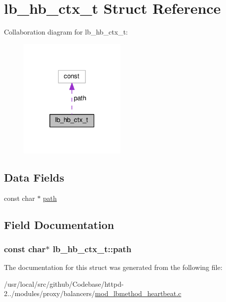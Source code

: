 \hypertarget{structlb__hb__ctx__t}{}\section{lb\+\_\+hb\+\_\+ctx\+\_\+t Struct Reference}
\label{structlb__hb__ctx__t}


Collaboration diagram for lb\+\_\+hb\+\_\+ctx\+\_\+t\+:
\nopagebreak
\begin{figure}[H]
\begin{center}
\leavevmode
\includegraphics[width=147pt]{structlb__hb__ctx__t__coll__graph}
\end{center}
\end{figure}
\subsection*{Data Fields}
\begin{DoxyCompactItemize}
\item 
const char $\ast$ \hyperlink{structlb__hb__ctx__t_aef9860352bf5ca3812ed65ed4fbf97b7}{path}
\end{DoxyCompactItemize}


\subsection{Field Documentation}
\subsubsection[{\texorpdfstring{path}{path}}]{\setlength{\rightskip}{0pt plus 5cm}const char$\ast$ lb\+\_\+hb\+\_\+ctx\+\_\+t\+::path}\hypertarget{structlb__hb__ctx__t_aef9860352bf5ca3812ed65ed4fbf97b7}{}\label{structlb__hb__ctx__t_aef9860352bf5ca3812ed65ed4fbf97b7}


The documentation for this struct was generated from the following file\+:\begin{DoxyCompactItemize}
\item 
/usr/local/src/github/\+Codebase/httpd-\/2../modules/proxy/balancers/\hyperlink{mod__lbmethod__heartbeat_8c}{mod\+\_\+lbmethod\+\_\+heartbeat.\+c}\end{DoxyCompactItemize}

